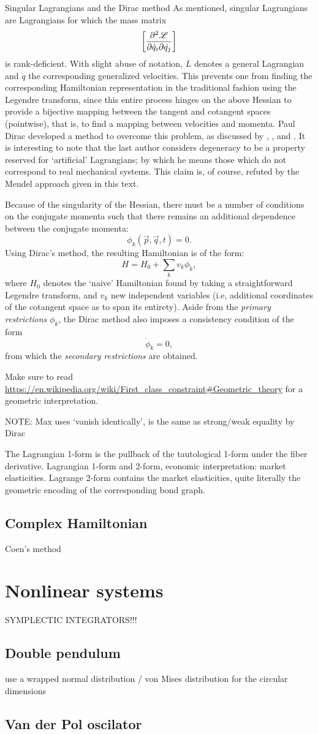 \begin{aside}{Singular Lagrangians and the Dirac method}
    As mentioned, singular Lagrangians are Lagrangians for which the mass matrix
    $$ \qty[\pdv{\mathscr{L}}{\dot{q}_i}{\dot{q_j}}]$$
    is rank-deficient. With slight abuse of notation, $L$ denotes a general Lagrangian and $\dot{q}$ the corresponding generalized velocities. This prevents one from finding the corresponding Hamiltonian representation in the traditional fashion using the Legendre transform, since this entire process hinges on the above Hessian to provide a bijective mapping between the tangent and cotangent spaces (pointwise), that is, to find a mapping between velocities and momenta. Paul Dirac developed a method to overcome this problem, as discussed by \citet{Dirac1950}, \citet{Kunzle1969}, and \citet{Cisneros-Parra2012}. It is interesting to note that the last author considers degeneracy to be a property reserved for `artificial' Lagrangians; by which he means those which do not correspond to real mechanical systems. This claim is, of course, refuted by the Mendel approach given in this text.

    Because of the singularity of the Hessian, there must be a number of conditions on the conjugate momenta such that there remains an additional dependence between the conjugate momenta:
    $$ \phi_k(\vec{p}, \vec{q}, t) = 0. $$
    Using Dirac's method, the resulting Hamiltonian is of the form: \cite{Cisneros-Parra2012}
    $$ H = H_0 + \sum_k v_k \phi_k, $$
    where $H_0$ denotes the `naive' Hamiltonian found by taking a straightforward Legendre transform, and $v_k$ new independent variables (i.e, additional coordinates of the cotangent space as to span its entirety). Aside from the \emph{primary restrictions} $\phi_k$, the Dirac method also imposes a consistency condition of the form 
    $$ \dot{\phi}_k = 0, $$
    from which the \emph{secondary restrictions} are obtained.

    Make sure to read \url{https://en.wikipedia.org/wiki/First_class_constraint#Geometric_theory} for a geometric interpretation.

    NOTE: Max uses `vanish identically', is the same as strong/weak equality by Dirac
\end{aside}

The Lagrangian 1-form is the pullback of the tautological 1-form under the fiber derivative. Lagrangian 1-form and 2-form, economic interpretation: market elasticities. Lagrange 2-form contains the market elasticities, quite literally the geometric encoding of the corresponding bond graph.

\subsection{Complex Hamiltonian}
Coen's method

\section{Nonlinear systems}
SYMPLECTIC INTEGRATORS!!!
\subsection{Double pendulum}
use a wrapped normal distribution / von Mises distribution for the circular dimensions


\subsection{Van der Pol oscilator}

